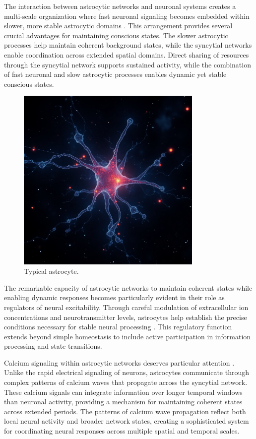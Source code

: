 The interaction between astrocytic networks and neuronal systems creates a multi-scale organization where fast neuronal signaling becomes embedded within slower, more stable astrocytic domains \cite{Halassa2010}. This arrangement provides several crucial advantages for maintaining conscious states. The slower astrocytic processes help maintain coherent background states, while the syncytial networks enable coordination across extended spatial domains. Direct sharing of resources through the syncytial network supports sustained activity, while the combination of fast neuronal and slow astrocytic processes enables dynamic yet stable conscious states.

\begin{figure}[h]
    \centering
    \includegraphics[width=0.8\textwidth]{images/astrocyte.png}

    \caption{Typical astrocyte.}
\end{figure}

The remarkable capacity of astrocytic networks to maintain coherent states while enabling dynamic responses becomes particularly evident in their role as regulators of neural excitability. Through careful modulation of extracellular ion concentrations and neurotransmitter levels, astrocytes help establish the precise conditions necessary for stable neural processing \cite{Araque2014}. This regulatory function extends beyond simple homeostasis to include active participation in information processing and state transitions.

Calcium signaling within astrocytic networks deserves particular attention \cite{Bazargani2016}. Unlike the rapid electrical signaling of neurons, astrocytes communicate through complex patterns of calcium waves that propagate across the syncytial network. These calcium signals can integrate information over longer temporal windows than neuronal activity, providing a mechanism for maintaining coherent states across extended periods. The patterns of calcium wave propagation reflect both local neural activity and broader network states, creating a sophisticated system for coordinating neural responses across multiple spatial and temporal scales.

